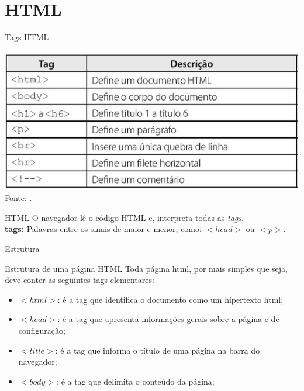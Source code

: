 \documentclass{beamer}
\begin{document}
\section{HTML}
\begin{frame}{Tags HTML}
  \begin{center}
    \includegraphics[height=0.5\paperheight]{fig/aula1/tagBasica.png}\\
    \tiny{Fonte: \cite{marinho2016}.}
   \end{center}
\end{frame}
\begin{frame}{HTML}
  O navegador lê o código HTML e, interpreta todas as \textit{tags}. \\
   \textbf{tags:} Palavras entre os sinais de maior e menor, como: 
$<head>$ ou $<p>$.
\end{frame}
\begin{frame}{Estrutura}
  \begin{block}{Estrutura de uma página HTML}
    Toda página html, por mais simples que seja, deve conter as seguintes tags 
elementares:
    \begin{itemize}
     \item $<html>$: é a tag que identifica o documento como um hipertexto html;
     \item $<head>$: é a tag que apresenta informações gerais sobre a 
página e de configuração;
     \item $<title>$: é a tag que informa o título de uma página na barra 
do navegador;
     \item $<body>$: é a tag que delimita o conteúdo da página;
  \end{itemize}
  \end{block}
\end{frame}
\end{document}
